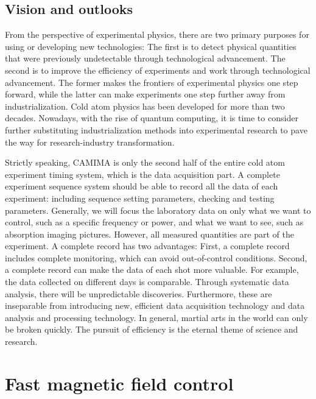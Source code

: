 \subsection{Vision and outlooks}

From the perspective of experimental physics, there are two primary purposes for using or developing new technologies: The first is to detect physical quantities that were previously undetectable through technological advancement. The second is to improve the efficiency of experiments and work through technological advancement. The former makes the frontiers of experimental physics one step forward, while the latter can make experiments one step further away from industrialization. Cold atom physics has been developed for more than two decades. Nowadays, with the rise of quantum computing, it is time to consider further substituting industrialization methods into experimental research to pave the way for research-industry transformation.

Strictly speaking, CAMIMA is only the second half of the entire cold atom experiment timing system, which is the data acquisition part. A complete experiment sequence system should be able to record all the data of each experiment: including sequence setting parameters, checking and testing parameters. Generally, we will focus the laboratory data on only what we want to control, such as a specific frequency or power, and what we want to see, such as absorption imaging pictures. However, all measured quantities are part of the experiment. A complete record has two advantages: First, a complete record includes complete monitoring, which can avoid out-of-control conditions. Second, a complete record can make the data of each shot more valuable. For example, the data collected on different days is comparable. Through systematic data analysis, there will be unpredictable discoveries. Furthermore, these are inseparable from introducing new, efficient data acquisition technology and data analysis and processing technology. In general, martial arts in the world can only be broken quickly. The pursuit of efficiency is the eternal theme of science and research.

\section{Fast magnetic field control}
\label{sec:fastcoil}

